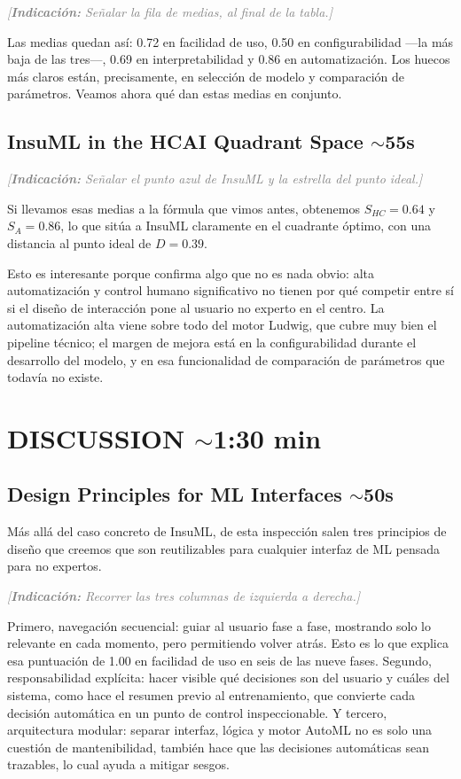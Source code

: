 \documentclass[11pt,a4paper]{article}
\newcommand{\indicacion}[1]{%
    \par\medskip
    \noindent\textcolor{gray}{\textit{[\textbf{Indicaci\'on:} #1]}}
    \par\medskip
}
\begin{document}
\indicacion{Señalar la fila de medias, al final de la tabla.}
Las medias quedan así: 0.72 en facilidad de uso, 0.50 en configurabilidad —la más baja de las tres—, 0.69 en interpretabilidad y 0.86 en automatización. Los huecos más claros están, precisamente, en selección de modelo y comparación de parámetros. Veamos ahora qué dan estas medias en conjunto.

\subsection{InsuML in the HCAI Quadrant Space \hfill \normalfont\small $\sim$55s}
\indicacion{Señalar el punto azul de InsuML y la estrella del punto ideal.}
Si llevamos esas medias a la fórmula que vimos antes, obtenemos $S_{HC} = 0.64$ y $S_A = 0.86$, lo que sitúa a InsuML claramente en el cuadrante óptimo, con una distancia al punto ideal de $D = 0.39$.

Esto es interesante porque confirma algo que no es nada obvio: alta automatización y control humano significativo no tienen por qué competir entre sí si el diseño de interacción pone al usuario no experto en el centro. La automatización alta viene sobre todo del motor Ludwig, que cubre muy bien el pipeline técnico; el margen de mejora está en la configurabilidad durante el desarrollo del modelo, y en esa funcionalidad de comparación de parámetros que todavía no existe.

\section{DISCUSSION \hfill \normalfont\small $\sim$1:30 min}

\subsection{Design Principles for ML Interfaces \hfill \normalfont\small $\sim$50s}
Más allá del caso concreto de InsuML, de esta inspección salen tres principios de diseño que creemos que son reutilizables para cualquier interfaz de ML pensada para no expertos.

\indicacion{Recorrer las tres columnas de izquierda a derecha.}
Primero, navegación secuencial: guiar al usuario fase a fase, mostrando solo lo relevante en cada momento, pero permitiendo volver atrás. Esto es lo que explica esa puntuación de 1.00 en facilidad de uso en seis de las nueve fases. Segundo, responsabilidad explícita: hacer visible qué decisiones son del usuario y cuáles del sistema, como hace el resumen previo al entrenamiento, que convierte cada decisión automática en un punto de control inspeccionable. Y tercero, arquitectura modular: separar interfaz, lógica y motor AutoML no es solo una cuestión de mantenibilidad, también hace que las decisiones automáticas sean trazables, lo cual ayuda a mitigar sesgos.
\end{document}
